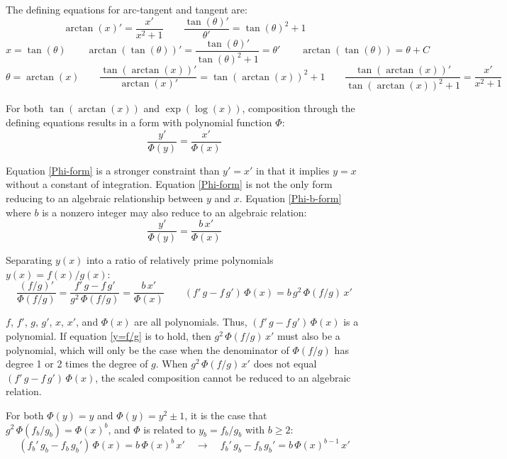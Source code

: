 \documentclass[10pt,letterpaper]{article}
\theoremstyle{proclaim}
\begin{document}
The defining equations for arc-tangent and tangent are:
\begin{equation}
\arctan(x)'={\frac{x'}{ x^2+1}}\qquad
 {\frac{\tan(\theta)'}{\theta'}}=\tan(\theta)^2+1\label{tan-arctan-defs}
\end{equation}
\[
x=\tan(\theta)\qquad
 \arctan(\tan(\theta))'={\frac{\tan(\theta)'}{\tan(\theta)^2+1}}=\theta'
 \qquad \arctan(\tan(\theta))=\theta+C
\]
\[
\theta=\arctan(x)\qquad
 {\frac{\tan(\arctan(x))'}{\arctan(x)'}}=\tan(\arctan(x))^2+1
 \qquad{\frac{\tan(\arctan(x))'}{\tan(\arctan(x))^2+1}}={\frac{x'}{ x^2+1}}
\]

For both $\tan(\arctan(x))$ and $\exp(\log(x))$, composition through
the defining equations results in a form with polynomial function
$\Phi$:
\begin{equation}
{\frac{y'}{\Phi(y)}}={\frac{x'}{\Phi(x)}}\label{Phi-form}
\end{equation}

Equation \eqref{Phi-form} is a stronger constraint than $y'=x'$ in
that it implies $y=x$ without a constant of integration.
Equation \eqref{Phi-form} is not the only form reducing to an
algebraic relationship between $y$ and $x$.
Equation \eqref{Phi-b-form} where $b$ is a nonzero integer may also
reduce to an algebraic relation:
\begin{equation}
{\frac{y'}{\Phi(y)}}={\frac{b\,x'}{\Phi(x)}}\label{Phi-b-form}
\end{equation}

Separating $y(x)$ into a ratio of relatively prime polynomials
$y(x)=f(x)/g(x)$:
\begin{equation}
{\frac{(f/g)'}{\Phi(f/g)}}=
   {\frac{f'\,g-f\,g'}{ g^2\,\Phi(f/g)}}={\frac{b\,x'}{\Phi(x)}}\qquad
   ({f'\,g-f\,g'})\,{\Phi(x)}=b\,g^2\,\Phi(f/g)\,x'\label{y=f/g}
\end{equation}

$f$, $f'$, $g$, $g'$, $x$, $x'$, and $\Phi(x)$ are all polynomials.
Thus, $({f'\,g-f\,g'})\,{\Phi(x)}$ is a polynomial.  If
equation \eqref{y=f/g} is to hold, then $g^2\,\Phi(f/g)\,x'$ must also
be a polynomial, which will only be the case when the denominator of
$\Phi(f/g)$ has degree 1 or 2 times the degree of $g$.  When
$g^2\,\Phi(f/g)\,x'$ does not equal $({f'\,g-f\,g'})\,{\Phi(x)}$, the
scaled composition cannot be reduced to an algebraic relation.

For both $\Phi(y)=y$ and $\Phi(y)=y^2\pm1$, it is the case that
$g^2\,\Phi(f_b/g_b)={\Phi(x)}^b$, and $\Phi$ is related to
$y_b=f_b/g_b$ with $b\ge2$:
\[
\left({f_b'\,g_b-f_b\,g_b'}\right)\,{\Phi(x)}=b\,{\Phi(x)}^b\,x'\quad\to\quad
  {f_b'\,g_b-f_b\,g_b'}=b\,{\Phi(x)}^{b-1}\,x'
\]
\end{document}
